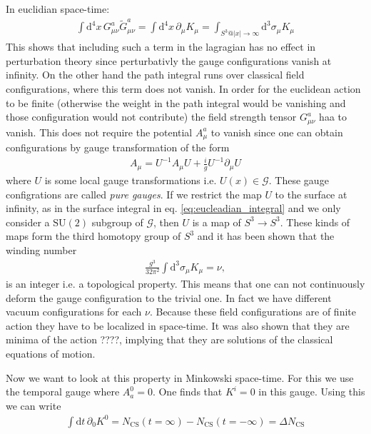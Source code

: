 \documentclass[13pt,a4paper,twoside,titlepage]{article}
\begin{document}
In euclidian space-time:
\begin{align}
    \label{eq:eucleadian_integral}
    \int \mathrm{d}^4 x \, G^a_{\mu \nu} \tilde{G}^a_{\mu \nu} = \int \mathrm{d}^4 x \, \partial_\mu K_\mu = \int_{S^3 @ |x| \to \infty} \mathrm{d}^3 \sigma_\mu K_\mu
\end{align}
This shows that including such a term in the lagragian has no effect in perturbation theory since perturbativly the gauge configurations vanish at infinity.
On the other hand the path integral runs over classical field configurations, where this term does not vanish.
In order for the euclidean action to be finite (otherwise the weight in the path integral would be vanishing and those configuration would not contribute) the field strength tensor $G^a_{\mu \nu}$ haa to vanish.
This does not require the potential $A^a_\mu$ to vanish since one can obtain configurations by gauge transformation of the form
\begin{align}
    A_\mu = U^{-1} A_\mu U + \frac{i}{g} U^{-1} \partial_\mu U
\end{align}
where $U$ is some local gauge transformations i.e. $U(x) \in \mathcal{G}$.
These gauge configrations are called \emph{pure gauges}.
If we restrict the map $U$ to the surface at infinity, as in the surface integral in eq. \eqref{eq:eucleadian_integral} and we only consider a $\mathrm{SU}(2)$ subgroup of $\mathcal{G}$,
then $U$ is a map of $S^3 \to S^3$.
These kinds of maps form the third homotopy group of $S^3$ and it has been shown that the winding number
\begin{align}
    \label{eq:winding_number}
    \frac{g^3}{32 \pi^2} \int \mathrm{d}^3 \sigma_\mu K_\mu
    = \nu,
\end{align}
is an integer i.e. a topological property.
This means that one can not continuously deform the gauge configuration to the trivial one. In fact we have different vacuum configurations for each $\nu$.
Because these field configurations are of finite action they have to be localized in space-time.
It was also shown that they are minima of the action ????, implying that they are solutions of the classical equations of motion.

Now we want to look at this property in Minkowski space-time.
For this we use the temporal gauge where $A_a^0 = 0$. One finds that $K^i = 0$ in this gauge.
Using this we can write
\begin{align}
    \int \mathrm{d} t \, \partial_0 K^0 = N_{\mathrm{CS}}(t = \infty) - N_{\mathrm{CS}}(t = -\infty) = \Delta N_{\mathrm{CS}}
\end{align}
\end{document}
